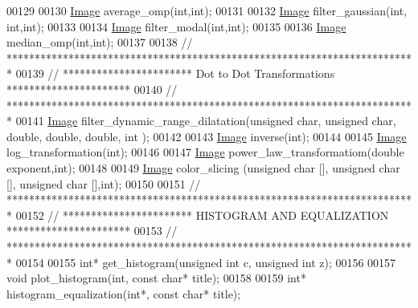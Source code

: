\begin{DoxyCode}
00129     
00130     \hyperlink{class_image}{Image} average\_omp(\textcolor{keywordtype}{int},\textcolor{keywordtype}{int});
00131     
00132     \hyperlink{class_image}{Image} filter\_gaussian(\textcolor{keywordtype}{int}, \textcolor{keywordtype}{int},\textcolor{keywordtype}{int}); 
00133     
00134     \hyperlink{class_image}{Image} filter\_modal(\textcolor{keywordtype}{int},\textcolor{keywordtype}{int}); 
00135     
00136     \hyperlink{class_image}{Image} median\_omp(\textcolor{keywordtype}{int},\textcolor{keywordtype}{int});
00137 
00138 \textcolor{comment}{// *************************************************************************}
00139 \textcolor{comment}{// *********************** Dot to Dot Transformations **********************}
00140 \textcolor{comment}{// *************************************************************************}
00141     \hyperlink{class_image}{Image} filter\_dynamic\_range\_dilatation(\textcolor{keywordtype}{unsigned} \textcolor{keywordtype}{char}, \textcolor{keywordtype}{unsigned} \textcolor{keywordtype}{char}, \textcolor{keywordtype}{double}, \textcolor{keywordtype}{double}, \textcolor{keywordtype}{double}, \textcolor{keywordtype}{int} );
00142 
00143     \hyperlink{class_image}{Image} inverse(\textcolor{keywordtype}{int}); 
00144     
00145     \hyperlink{class_image}{Image} log\_transformation(\textcolor{keywordtype}{int}); 
00146     
00147     \hyperlink{class_image}{Image} power\_law\_transformatiom(\textcolor{keywordtype}{double} exponent,\textcolor{keywordtype}{int}); 
00148 
00149     \hyperlink{class_image}{Image} color\_slicing (\textcolor{keywordtype}{unsigned} \textcolor{keywordtype}{char} [], \textcolor{keywordtype}{unsigned} \textcolor{keywordtype}{char} [], \textcolor{keywordtype}{unsigned} \textcolor{keywordtype}{char} [],\textcolor{keywordtype}{int}); 
00150     
00151 \textcolor{comment}{// *************************************************************************}
00152 \textcolor{comment}{// *********************** HISTOGRAM AND EQUALIZATION **********************}
00153 \textcolor{comment}{// *************************************************************************}
00154 
00155     \textcolor{keywordtype}{int}* get\_histogram(\textcolor{keywordtype}{unsigned} \textcolor{keywordtype}{int} c, \textcolor{keywordtype}{unsigned} \textcolor{keywordtype}{int} z); 
00156     
00157     \textcolor{keywordtype}{void} plot\_histogram(\textcolor{keywordtype}{int}, \textcolor{keyword}{const} \textcolor{keywordtype}{char}* title); 
00158     
00159     \textcolor{keywordtype}{int}* histogram\_equalization(\textcolor{keywordtype}{int}*, \textcolor{keyword}{const} \textcolor{keywordtype}{char}* title);

\end{DoxyCode}
